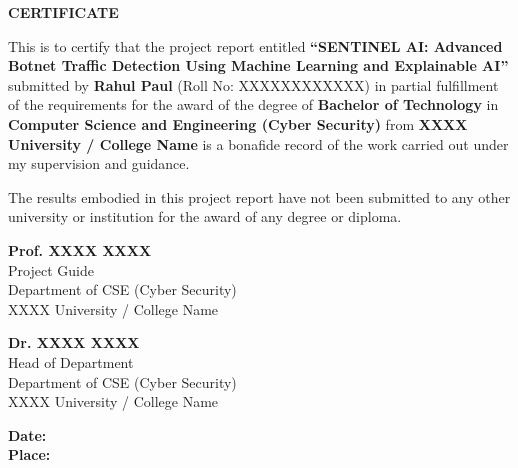 \thispagestyle{frontmatter}
\newpage

\begin{center}
\vspace*{1.5cm}
{\LARGE \textbf{CERTIFICATE}}\\[1.5cm]
\end{center}

\noindent This is to certify that the project report entitled \textbf{``SENTINEL AI: Advanced Botnet Traffic Detection Using Machine Learning and Explainable AI''} submitted by \textbf{Rahul Paul} (Roll No: XXXXXXXXXXXX) in partial fulfillment of the requirements for the award of the degree of \textbf{Bachelor of Technology} in \textbf{Computer Science and Engineering (Cyber Security)} from \textbf{XXXX University / College Name} is a bonafide record of the work carried out under my supervision and guidance.

\vspace{0.5cm}
\noindent The results embodied in this project report have not been submitted to any other university or institution for the award of any degree or diploma.

\vspace{3cm}

\noindent
\begin{minipage}[t]{0.45\textwidth}
\textbf{Prof. XXXX XXXX}\\
Project Guide\\
Department of CSE (Cyber Security)\\
XXXX University / College Name
\end{minipage}
\hfill
\begin{minipage}[t]{0.45\textwidth}
\raggedleft
\textbf{Dr. XXXX XXXX}\\
Head of Department\\
Department of CSE (Cyber Security)\\
XXXX University / College Name
\end{minipage}

\vspace{2cm}
\begin{center}
\textbf{Date:} \underline{\hspace{3cm}}\\[0.5cm]
\textbf{Place:} \underline{\hspace{3cm}}
\end{center}
